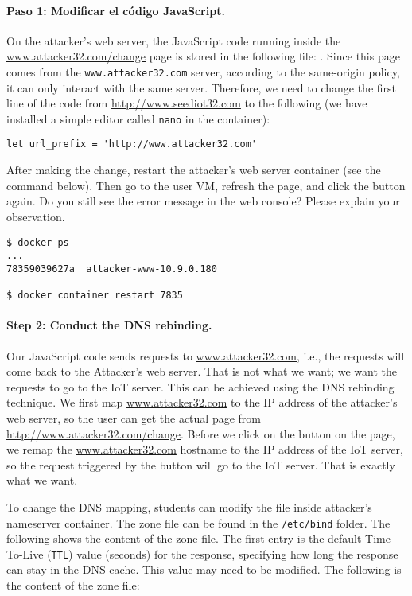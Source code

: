 \paragraph{Paso 1: Modificar el código JavaScript.}
On the attacker's web server, the JavaScript code running inside the 
\url{www.attacker32.com/change} page is 
stored in the following file: 
. Since this page
comes from the \texttt{www.attacker32.com} server, 
according to the same-origin policy, it can only
interact with the same server. Therefore, we need to change the first 
line of the code from \url{http://www.seediot32.com} 
to the following (we have installed a simple editor called \texttt{nano}
in the container):

\begin{lstlisting}
let url_prefix = 'http://www.attacker32.com'
\end{lstlisting}
 

After making the change, restart the attacker's web server container (see the 
command below). Then go to the user VM, refresh the page, and click the button again. 
Do you still see the error
message in the web console? Please explain your observation. 


\begin{lstlisting}
$ docker ps
...
78359039627a  attacker-www-10.9.0.180

$ docker container restart 7835
\end{lstlisting}
 


\paragraph{Step 2: Conduct the DNS rebinding.}
Our JavaScript code sends requests to \url{www.attacker32.com}, 
i.e., the requests will come back to the Attacker's web server. That is not 
what we want; we want the requests to go to the IoT server. 
This can be achieved using the DNS rebinding 
technique. We first map \url{www.attacker32.com} to the IP address of the attacker's
web server, so
the user can get the actual page from \url{http://www.attacker32.com/change}. 
Before we click on the button on the page, we remap
the \url{www.attacker32.com} hostname to the IP address of the IoT server, so
the request triggered by the button will go to the IoT server. That is exactly what 
we want. 


To change the DNS mapping, students can modify the 
 file inside attacker's nameserver container.
The zone file can be found in 
the \texttt{/etc/bind} folder. 
The following shows the content of the zone file. The first 
entry is the default Time-To-Live (\texttt{TTL}) value (seconds) 
for the response, specifying how long the response can stay in
the DNS cache. This value may need to be modified. 
The following is the content of the zone file:

